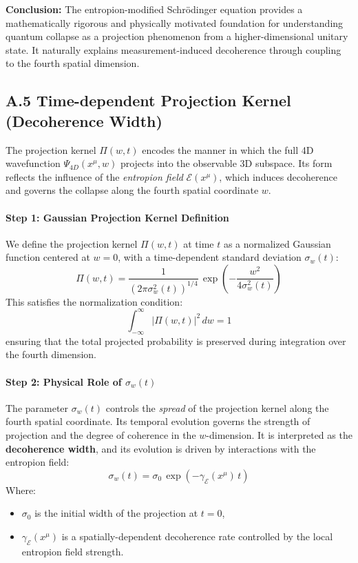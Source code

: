 \documentclass[12pt]{article}
\begin{document}
\textbf{Conclusion:}  
The entropion-modified Schrödinger equation provides a mathematically rigorous and physically motivated foundation for understanding quantum collapse as a projection phenomenon from a higher-dimensional unitary state. It naturally explains measurement-induced decoherence through coupling to the fourth spatial dimension.




\subsection*{A.5 \quad Time-dependent Projection Kernel (Decoherence Width)}
\label{eq:A5}

The projection kernel \(\Pi(w, t)\) encodes the manner in which the full 4D wavefunction \(\Psi_{4D}(x^\mu, w)\) projects into the observable 3D subspace. Its form reflects the influence of the \emph{entropion field} \(\mathcal{E}(x^\mu)\), which induces decoherence and governs the collapse along the fourth spatial coordinate \(w\).

\paragraph{Step 1: Gaussian Projection Kernel Definition}

We define the projection kernel \(\Pi(w, t)\) at time \(t\) as a normalized Gaussian function centered at \(w = 0\), with a time-dependent standard deviation \(\sigma_w(t)\):
\begin{equation}
\Pi(w, t) = \frac{1}{(2\pi \sigma_w^2(t))^{1/4}}\, \exp\left(-\frac{w^2}{4\sigma_w^2(t)}\right)
\label{eq:A5_Gaussian}
\end{equation}
This satisfies the normalization condition:
\begin{equation}
\int_{-\infty}^{\infty} |\Pi(w, t)|^2\, dw = 1
\label{eq:A5_Normalization}
\end{equation}
ensuring that the total projected probability is preserved during integration over the fourth dimension.

\paragraph{Step 2: Physical Role of \(\sigma_w(t)\)}

The parameter \(\sigma_w(t)\) controls the \emph{spread} of the projection kernel along the fourth spatial coordinate. Its temporal evolution governs the strength of projection and the degree of coherence in the \(w\)-dimension. It is interpreted as the \textbf{decoherence width}, and its evolution is driven by interactions with the entropion field:
\begin{equation}
\sigma_w(t) = \sigma_0\, \exp\left(-\gamma_\mathcal{E}(x^\mu)\, t\right)
\label{eq:A5_SigmaDecay}
\end{equation}
Where:
\begin{itemize}
  \item \(\sigma_0\) is the initial width of the projection at \(t = 0\),
  \item \(\gamma_\mathcal{E}(x^\mu)\) is a spatially-dependent decoherence rate controlled by the local entropion field strength.
\end{itemize}
\end{document}

